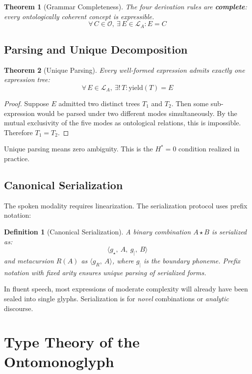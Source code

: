 \documentclass[12pt, letterpaper]{book}
\def\equiv{=}%
\def\circlearrowleft{R}%
\def\mathfrak#1{#1}%
\newtheorem{theorem}{Theorem}[chapter]
\newtheorem{definition}{Definition}[chapter]
\begin{document}
\begin{theorem}[Grammar Completeness]
The four derivation rules are \textbf{complete}: every ontologically coherent concept is expressible.
\[
\forall\, C \in \mathcal{O},\ \exists\, E \in \mathcal{L}_A: E \equiv C
\]
\end{theorem}


\section{Parsing and Unique Decomposition}

\begin{theorem}[Unique Parsing]\label{thm:uniqueparse}
Every well-formed expression admits exactly one expression tree:
\[
\forall\, E \in \mathcal{L}_A,\ \exists!\, T: \mathrm{yield}(T) \equiv E
\]
\end{theorem}

\begin{proof}
Suppose $E$ admitted two distinct trees $T_1$ and $T_2$. Then some sub-expression would be parsed under two different modes simultaneously. By the mutual exclusivity of the five modes as ontological relations, this is impossible. Therefore $T_1 \equiv T_2$.
\end{proof}

Unique parsing means zero ambiguity. This is the $H^* \equiv 0$ condition realized in practice.


\section{Canonical Serialization}

The spoken modality requires linearization. The serialization protocol uses prefix notation:

\begin{definition}[Canonical Serialization]
A binary combination $A \star B$ is serialized as:
\[
\langle \mathfrak{g}_\star,\ A,\ \mathfrak{g}_{|},\ B \rangle
\]
and metacursion $\circlearrowleft(A)$ as $\langle \mathfrak{g}_\circlearrowleft,\ A \rangle$, where $\mathfrak{g}_{|}$ is the boundary phoneme. Prefix notation with fixed arity ensures unique parsing of serialized forms.
\end{definition}

In fluent speech, most expressions of moderate complexity will already have been sealed into single glyphs. Serialization is for \textit{novel} combinations or \textit{analytic} discourse.


\chapter{Type Theory of the Ontomonoglyph}
\end{document}
